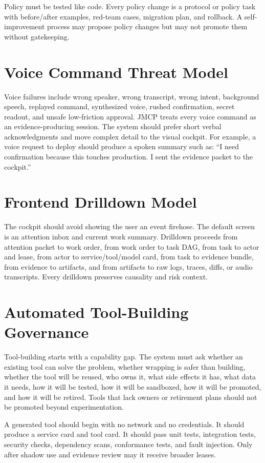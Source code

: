 \documentclass[10pt,journal,onecolumn]{IEEEtran}
\begin{document}
Policy must be tested like code. Every policy change is a protocol or policy task with before/after examples, red-team cases, migration plan, and rollback. A self-improvement process may propose policy changes but may not promote them without gatekeeping.

\section{Voice Command Threat Model}
Voice failures include wrong speaker, wrong transcript, wrong intent, background speech, replayed command, synthesized voice, rushed confirmation, secret readout, and unsafe low-friction approval. JMCP treats every voice command as an evidence-producing session. The system should prefer short verbal acknowledgments and move complex detail to the visual cockpit. For example, a voice request to deploy should produce a spoken summary such as: ``I need confirmation because this touches production. I sent the evidence packet to the cockpit.''

\section{Frontend Drilldown Model}
The cockpit should avoid showing the user an event firehose. The default screen is an attention inbox and current work summary. Drilldown proceeds from attention packet to work order, from work order to task DAG, from task to actor and lease, from actor to service/tool/model card, from task to evidence bundle, from evidence to artifacts, and from artifacts to raw logs, traces, diffs, or audio transcripts. Every drilldown preserves causality and risk context.

\section{Automated Tool-Building Governance}
Tool-building starts with a capability gap. The system must ask whether an existing tool can solve the problem, whether wrapping is safer than building, whether the tool will be reused, who owns it, what side effects it has, what data it needs, how it will be tested, how it will be sandboxed, how it will be promoted, and how it will be retired. Tools that lack owners or retirement plans should not be promoted beyond experimentation.

A generated tool should begin with no network and no credentials. It should produce a service card and tool card. It should pass unit tests, integration tests, security checks, dependency scans, conformance tests, and fault injection. Only after shadow use and evidence review may it receive broader leases.
\end{document}
